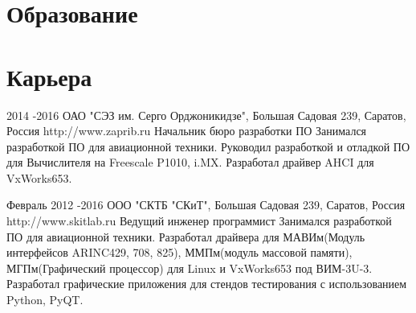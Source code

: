 \section{Образование}





\section{Карьера}

\job
{2014 -}{2016}
{ОАО "СЭЗ им. Серго Орджоникидзе", Большая Садовая 239, Саратов, Россия}
{http://www.zaprib.ru}
{Начальник бюро разработки ПО}
{Занимался разработкой ПО для авиационной техники. Руководил разработкой и отладкой ПО для Вычислителя на Freescale P1010, i.MX. Разработал драйвер AHCI для VxWorks653.}


\job
{Февраль 2012 -}{2016}
{ООО "СКТБ "СКиТ", Большая Садовая 239, Саратов, Россия}
{http://www.skitlab.ru}
{Ведущий инженер программист}
{Занимался разработкой ПО для авиационной техники. Разработал драйвера для МАВИм(Модуль интерфейсов ARINC429, 708, 825), ММПм(модуль массовой памяти), МГПм(Графический процессор) для Linux и VxWorks653 под ВИМ-3U-3. Разработал графические приложения для стендов тестирования с использованием Python, PyQT.}


